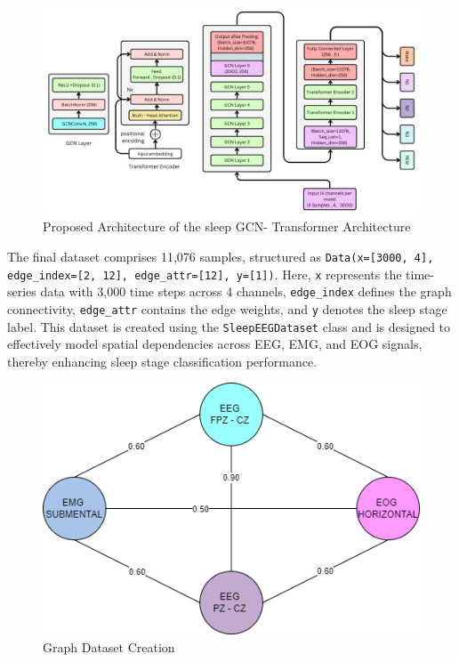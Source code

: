\begin{figure}
	\centering
	\includegraphics[width=.9\linewidth]{"img/paper_3/Graph Convolution Neural Network -SleepGCN_Transformer Architechture"}
	\caption{Proposed Architecture of the sleep GCN- Transformer Architecture}
	\label{fig:graph-convolution-neural-network--sleepgcntransformer-architechture}
\end{figure}

The final dataset comprises 11,076 samples, structured as \texttt{Data(x=[3000, 4], edge\_index=[2, 12], edge\_attr=[12], y=[1])}. Here, \texttt{x} represents the time-series data with 3,000 time steps across 4 channels, \texttt{edge\_index} defines the graph connectivity, \texttt{edge\_attr} contains the edge weights, and \texttt{y} denotes the sleep stage label. This dataset is created using the \texttt{SleepEEGDataset} class and is designed to effectively model spatial dependencies across EEG, EMG, and EOG signals, thereby enhancing sleep stage classification performance.


\begin{figure}
	\centering
	\includegraphics[width=0.7\linewidth]{"img/paper_3/Graph Weightage"}
	\caption{Graph Dataset Creation}
	\label{fig:graph-weightage}
\end{figure}

